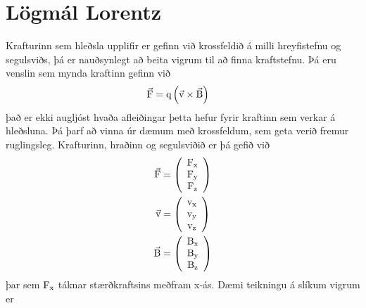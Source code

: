 \section{Lögmál Lorentz}
Krafturinn sem hleðsla upplifir er gefinn við krossfeldið á milli hreyfistefnu
og segulsviðs, þá er nauðsynlegt að beita vigrum til að finna kraftstefnu.
Þá eru venslin sem mynda kraftinn gefinn við
\begin{align}
	\vec{\textrm{F}} 
		&= \textrm{q} \left( \vec{\textrm{v}} 
			\times \vec{\text{B}}  \right)
\end{align}
það er ekki augljóst hvaða afleiðingar þetta hefur fyrir kraftinn sem verkar
á hleðsluna. Þá þarf að vinna úr dæmum með krossfeldum, sem geta verið fremur
ruglingsleg. Krafturinn, hraðinn og segulsviðið er þá gefið við
\begin{align*}
	\vec{\textrm{F}} &= 
		\left( 
		\begin{array}{c} 
			\textrm{F}_{\textrm{x}} \\
			\textrm{F}_{\textrm{y}} \\
			\textrm{F}_{\textrm{z}} \\
		\end{array} 
		\right) \\
	\vec{\textrm{v}} &= 
		\left( 
		\begin{array}{c} 
			\textrm{v}_{\textrm{x}} \\
			\textrm{v}_{\textrm{y}} \\
			\textrm{v}_{\textrm{z}} \\
		\end{array} 
		\right) \\
	\vec{\text{B}} &= 
		\left( 
		\begin{array}{c} 
			\text{B}_{\textrm{x}} \\
			\text{B}_{\textrm{y}} \\
			\text{B}_{\textrm{z}} \\
		\end{array} 
		\right) \\
\end{align*}
þar sem $\textrm{F}_{\textrm{x}}$ táknar stærðkraftsins meðfram x-ás. Dæmi teikningu
á slíkum vigrum er 
